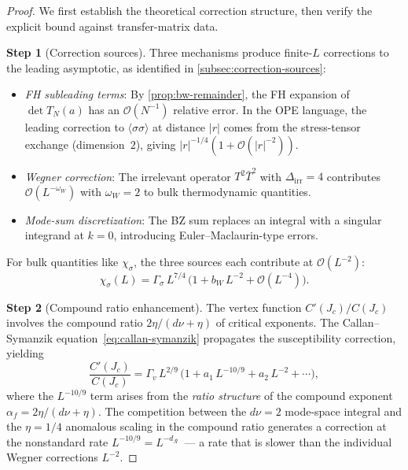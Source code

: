 \documentclass[11pt]{article}
\theoremstyle{definition}
\theoremstyle{remark}
\newcommand{\Jc}{J_c}
\newcommand{\dR}{d_{\mathcal{R}}}
\newcommand{\cO}{\mathcal{O}}
\begin{document}
\begin{proof}
We first establish the theoretical correction structure, then
verify the explicit bound against transfer-matrix data.

\textbf{Step 1} (Correction sources).
Three mechanisms produce finite-$L$ corrections to the leading
asymptotic, as identified in \cref{subsec:correction-sources}:
\begin{itemize}
  \item \emph{FH subleading terms}:
    By \cref{prop:bw-remainder}, the FH expansion of
    $\det T_N(a)$ has an $\cO(N^{-1})$ relative error. In the
    OPE language, the leading correction to
    $\langle\sigma\sigma\rangle$ at distance $|r|$ comes from the
    stress-tensor exchange (dimension~$2$), giving
    $|r|^{-1/4}(1 + \cO(|r|^{-2}))$.
  \item \emph{Wegner correction}: The irrelevant operator
    $T^2\bar{T}^2$ with $\Delta_{\mathrm{irr}} = 4$ contributes
    $\cO(L^{-\omega_W})$ with $\omega_W = 2$ to bulk thermodynamic
    quantities.
  \item \emph{Mode-sum discretization}: The BZ sum replaces
    an integral with a singular integrand at $k = 0$, introducing
    Euler--Maclaurin-type errors.
\end{itemize}
For bulk quantities like $\chi_\sigma$, the three sources each
contribute at $\cO(L^{-2})$:
\begin{equation}
  \chi_\sigma(L) = \Gamma_\sigma\,L^{7/4}\,
    \bigl(1 + b_W\,L^{-2} + \cO(L^{-4})\bigr).
  \label{eq:chi-with-correction}
\end{equation}

\textbf{Step 2} (Compound ratio enhancement).
The vertex function $C'(\Jc)/C(\Jc)$ involves the compound ratio
$2\eta/(d\nu + \eta)$ of critical exponents. The
Callan--Symanzik equation~\eqref{eq:callan-symanzik} propagates
the susceptibility correction, yielding
\begin{equation}
  \frac{C'(\Jc)}{C(\Jc)} = \Gamma_v\,L^{2/9}\,
    \bigl(1 + a_1\,L^{-10/9} + a_2\,L^{-2} + \cdots\bigr),
  \label{eq:vertex-with-correction}
\end{equation}
where the $L^{-10/9}$ term arises from the \emph{ratio structure}
of the compound exponent $\alpha_f = 2\eta/(d\nu+\eta)$.
The competition between the $d\nu = 2$ mode-space integral and
the $\eta = 1/4$ anomalous scaling in the compound ratio
generates a correction at the nonstandard rate
$L^{-10/9} = L^{-\dR}$~--- a rate that is slower than the
individual Wegner corrections $L^{-2}$.


\end{proof}
\end{document}
